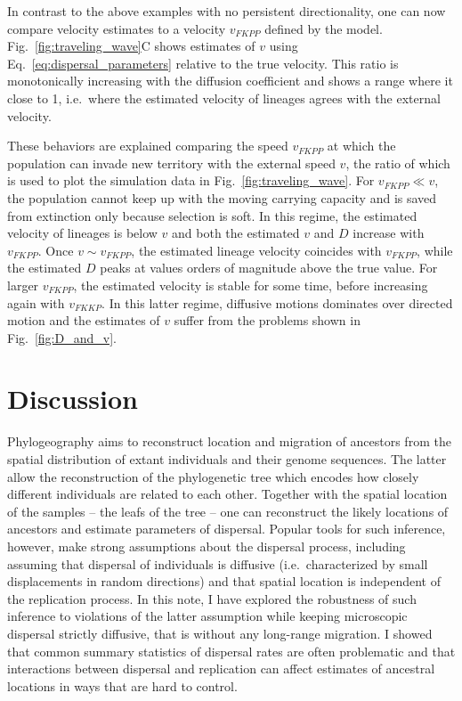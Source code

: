 \documentclass[aps,rmp, twocolumn]{revtex4}
\begin{document}
In contrast to the above examples with no persistent directionality, one can now compare velocity estimates to a velocity $v_{FKPP}$ defined by the model.
Fig.~\ref{fig:traveling_wave}C shows estimates of $v$ using Eq.~\ref{eq:dispersal_parameters} relative to the true velocity.
This ratio is monotonically increasing with the diffusion coefficient and shows a range where it close to 1, i.e.~where the estimated velocity of lineages agrees with the external velocity.

These behaviors are explained comparing the speed $v_{FKPP}$ at which the population can invade new territory with the external speed $v$, the ratio of which is used to plot the simulation data in Fig.~\ref{fig:traveling_wave}.
For $v_{FKPP} \ll v$, the population cannot keep up with the moving carrying capacity and is saved from extinction only because selection is soft.
In this regime, the estimated velocity of lineages is below $v$ and both the estimated $v$ and $D$ increase with $v_{FKPP}$.
Once $v\sim v_{FKPP}$, the estimated lineage velocity coincides with $v_{FKPP}$, while the estimated $D$ peaks at values orders of magnitude above the true value.
For larger $v_{FKPP}$, the estimated velocity is stable for some time, before increasing again with $v_{FKKP}$.
In this latter regime, diffusive motions dominates over directed motion and the estimates of $v$ suffer from the problems shown in Fig.~\ref{fig:D_and_v}.


\section*{Discussion}
Phylogeography aims to reconstruct location and migration of ancestors from the spatial distribution of extant individuals and their genome sequences.
The latter allow the reconstruction of the phylogenetic tree which encodes how closely different individuals are related to each other.
Together with the spatial location of the samples -- the leafs of the tree -- one can reconstruct the likely locations of ancestors and estimate parameters of dispersal.
Popular tools for such inference, however, make strong assumptions about the dispersal process, including assuming that dispersal of individuals is diffusive (i.e.~characterized by small displacements in random directions) and that spatial location is independent of the replication process.
In this note, I have explored the robustness of such inference to violations of the latter assumption while keeping microscopic dispersal strictly diffusive, that is without any long-range migration.
I showed that common summary statistics of dispersal rates are often problematic and that interactions between dispersal and replication can affect estimates of ancestral locations in ways that are hard to control.
\end{document}
